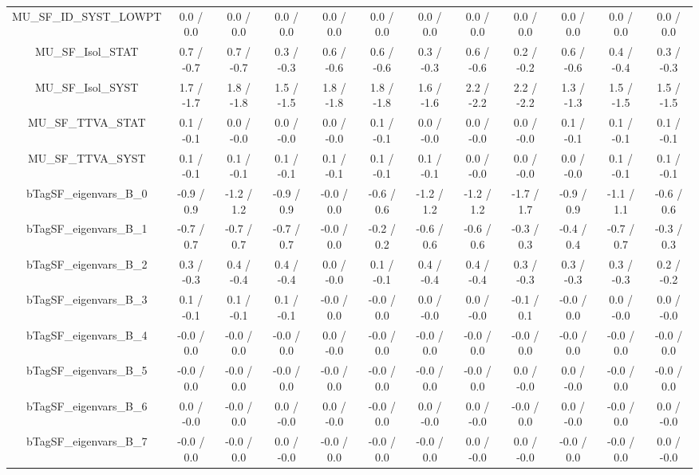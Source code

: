 \begin{table}[htbp]
\begin{center}
\begin{tabular}{|c|c|c|c|c|c|c|c|c|c|c|c|}
  MU_SF_ID_SYST_LOWPT & 0.0 / 0.0 & 0.0 / 0.0 & 0.0 / 0.0 & 0.0 / 0.0 & 0.0 / 0.0 & 0.0 / 0.0 & 0.0 / 0.0 & 0.0 / 0.0 & 0.0 / 0.0 & 0.0 / 0.0 & 0.0 / 0.0 \\ 
  MU_SF_Isol_STAT & 0.7 / -0.7 & 0.7 / -0.7 & 0.3 / -0.3 & 0.6 / -0.6 & 0.6 / -0.6 & 0.3 / -0.3 & 0.6 / -0.6 & 0.2 / -0.2 & 0.6 / -0.6 & 0.4 / -0.4 & 0.3 / -0.3 \\ 
  MU_SF_Isol_SYST & 1.7 / -1.7 & 1.8 / -1.8 & 1.5 / -1.5 & 1.8 / -1.8 & 1.8 / -1.8 & 1.6 / -1.6 & 2.2 / -2.2 & 2.2 / -2.2 & 1.3 / -1.3 & 1.5 / -1.5 & 1.5 / -1.5 \\ 
  MU_SF_TTVA_STAT & 0.1 / -0.1 & 0.0 / -0.0 & 0.0 / -0.0 & 0.0 / -0.0 & 0.1 / -0.1 & 0.0 / -0.0 & 0.0 / -0.0 & 0.0 / -0.0 & 0.1 / -0.1 & 0.1 / -0.1 & 0.1 / -0.1 \\ 
  MU_SF_TTVA_SYST & 0.1 / -0.1 & 0.1 / -0.1 & 0.1 / -0.1 & 0.1 / -0.1 & 0.1 / -0.1 & 0.1 / -0.1 & 0.0 / -0.0 & 0.0 / -0.0 & 0.0 / -0.0 & 0.1 / -0.1 & 0.1 / -0.1 \\ 
  bTagSF_eigenvars_B_0 & -0.9 / 0.9 & -1.2 / 1.2 & -0.9 / 0.9 & -0.0 / 0.0 & -0.6 / 0.6 & -1.2 / 1.2 & -1.2 / 1.2 & -1.7 / 1.7 & -0.9 / 0.9 & -1.1 / 1.1 & -0.6 / 0.6 \\ 
  bTagSF_eigenvars_B_1 & -0.7 / 0.7 & -0.7 / 0.7 & -0.7 / 0.7 & -0.0 / 0.0 & -0.2 / 0.2 & -0.6 / 0.6 & -0.6 / 0.6 & -0.3 / 0.3 & -0.4 / 0.4 & -0.7 / 0.7 & -0.3 / 0.3 \\ 
  bTagSF_eigenvars_B_2 & 0.3 / -0.3 & 0.4 / -0.4 & 0.4 / -0.4 & 0.0 / -0.0 & 0.1 / -0.1 & 0.4 / -0.4 & 0.4 / -0.4 & 0.3 / -0.3 & 0.3 / -0.3 & 0.3 / -0.3 & 0.2 / -0.2 \\ 
  bTagSF_eigenvars_B_3 & 0.1 / -0.1 & 0.1 / -0.1 & 0.1 / -0.1 & -0.0 / 0.0 & -0.0 / 0.0 & 0.0 / -0.0 & 0.0 / -0.0 & -0.1 / 0.1 & -0.0 / 0.0 & 0.0 / -0.0 & 0.0 / -0.0 \\ 
  bTagSF_eigenvars_B_4 & -0.0 / 0.0 & -0.0 / 0.0 & -0.0 / 0.0 & 0.0 / -0.0 & -0.0 / 0.0 & -0.0 / 0.0 & -0.0 / 0.0 & -0.0 / 0.0 & -0.0 / 0.0 & -0.0 / 0.0 & -0.0 / 0.0 \\ 
  bTagSF_eigenvars_B_5 & -0.0 / 0.0 & -0.0 / 0.0 & -0.0 / 0.0 & -0.0 / 0.0 & -0.0 / 0.0 & -0.0 / 0.0 & -0.0 / 0.0 & 0.0 / -0.0 & 0.0 / -0.0 & -0.0 / 0.0 & -0.0 / 0.0 \\ 
  bTagSF_eigenvars_B_6 & 0.0 / -0.0 & -0.0 / 0.0 & 0.0 / -0.0 & 0.0 / -0.0 & -0.0 / 0.0 & 0.0 / -0.0 & 0.0 / -0.0 & -0.0 / 0.0 & 0.0 / -0.0 & -0.0 / 0.0 & 0.0 / -0.0 \\ 
  bTagSF_eigenvars_B_7 & -0.0 / 0.0 & -0.0 / 0.0 & 0.0 / -0.0 & -0.0 / 0.0 & -0.0 / 0.0 & -0.0 / 0.0 & 0.0 / -0.0 & 0.0 / -0.0 & -0.0 / 0.0 & -0.0 / 0.0 & 0.0 / -0.0 \\ 

\end{tabular}
\end{center}
\end{table}
